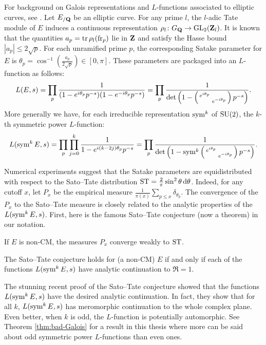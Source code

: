 For background on Galois representations and $L$-functions associated to 
elliptic curves, see \cite[III\S7, C\S17]{silverman-2009}. 
Let $E_{/\mathbf{Q}}$ be an elliptic curve. For any prime $l$, the $l$-adic Tate 
module of $E$ induces a continuous representation 
$\rho_l \colon G_{\mathbf{Q}} \to \operatorname{GL}_2(\mathbf{Z}_l)$. It is known that the quantities 
$a_p = \operatorname{tr} \rho_l(\mathrm{fr}_p)$ lie in $\mathbf{Z}$ and satisfy the Hasse bound 
$|a_p| \leqslant 2\sqrt p$. For each unramified prime $p$, the 
corresponding Satake parameter for $E$ is 
$\theta_p = \cos^{-1}\left(\frac{a_p}{2\sqrt p}\right) \in [0,\pi]$. 
These parameters are packaged into an $L$-function as follows:
\[
	L(E,s) = \prod_p \frac{1}{(1 - e^{i \theta_p} p^{-s})(1- e^{-i \theta_p} p^{-s})} = \prod_p \frac{1}{\det\left(1 - \left(\begin{smallmatrix} e^{i\theta_p} &  \\  & e^{-i \theta_p} \end{smallmatrix}\right)p^{-s}\right)}.
\]
More generally we have, for each irreducible representation $\operatorname{sym}^k$ of 
$\operatorname{SU}(2)$, the $k$-th symmetric power $L$-function: 
\[
	L(\operatorname{sym}^k E, s) = \prod_p \prod_{j=0}^k \frac{1}{1 - e^{i (k - 2j) \theta_p} p^{-s}} = \prod_p \frac{1}{\det\left(1-\operatorname{sym}^k \left(\begin{smallmatrix} e^{i\theta_p} &  \\  & e^{-i \theta_p} \end{smallmatrix}\right)p^{-s}\right)}.
\]

Numerical experiments suggest that the Satake parameters are equidistributed 
with respect to the Sato--Tate distribution 
$\mathrm{ST} = \frac{2}{\pi} \sin^2\theta\, \mathrm{d}\theta$. Indeed, for any cutoff $x$, let 
$P_x$ be the empirical measure 
$\frac{1}{\pi(x)} \sum_{p\leqslant x} \delta_{\theta_p}$. 
The convergence of the $P_x$ to the Sato--Tate measure is closely related to 
the analytic properties of the $L(\operatorname{sym}^k E,s)$. First, here is the famous 
Sato--Tate conjecture (now a theorem) in our notation. 

\begin{theorem}[Taylor et.~al.]
If $E$ is non-CM, the measures $P_x$ converge weakly to $\mathrm{ST}$. 
\end{theorem}

\begin{theorem}[Serre]
The Sato--Tate conjecture holds for (a non-CM) $E$ if and only if each of 
the functions $L(\operatorname{sym}^k E,s)$ have analytic continuation to $\Re = 1$. 
\end{theorem}

The stunning recent proof of the Sato--Tate conjecture 
\cite{clozel-harris-taylor-2008,taylor-2008,harris-shepherd-barron-taylor-2010} 
showed that the functions $L(\operatorname{sym}^k E,s)$ have the desired analytic 
continuation. In fact, they show that for all $k$, $L(\operatorname{sym}^k E,s)$ has 
meromorphic continuation to the whole complex plane. Even better, when $k$ is 
odd, the $L$-function is potentially automorphic. See Theorem 
\ref{thm:bad-Galois} for a result in this thesis where more can be said about 
odd symmetric power $L$-functions than even ones. 

